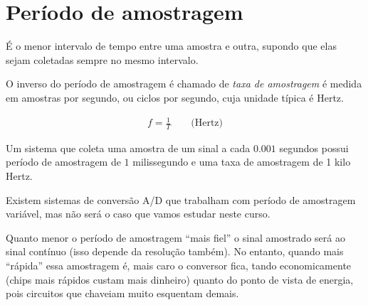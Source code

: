 \documentclass[
]{book}
\begin{document}
\hypertarget{peruxedodo-de-amostragem}{%
\section{Período de amostragem}\label{peruxedodo-de-amostragem}}

É o menor intervalo de tempo entre uma amostra e outra, supondo que elas sejam coletadas sempre no mesmo intervalo.

O inverso do período de amostragem é chamado de \emph{taxa de amostragem} é medida em amostras por segundo, ou ciclos por segundo, cuja unidade típica é Hertz.

\[
\begin{align}
    f = \frac{1}{T}\quad\quad \text{(Hertz)}
\end{align}
\]

Um sistema que coleta uma amostra de um sinal a cada \(0.001\) segundos possui período de amostragem de \(1\) milissegundo e uma taxa de amostragem de 1 kilo Hertz.

Existem sistemas de conversão A/D que trabalham com período de amostragem variável, mas não será o caso que vamos estudar neste curso.

Quanto menor o período de amostragem ``mais fiel'' o sinal amostrado será ao sinal contínuo (isso depende da resolução também). No entanto, quando mais ``rápida'' essa amostragem é, mais caro o conversor fica, tando economicamente (chips mais rápidos custam mais dinheiro) quanto do ponto de vista de energia, pois circuitos que chaveiam muito esquentam demais.
\end{document}
